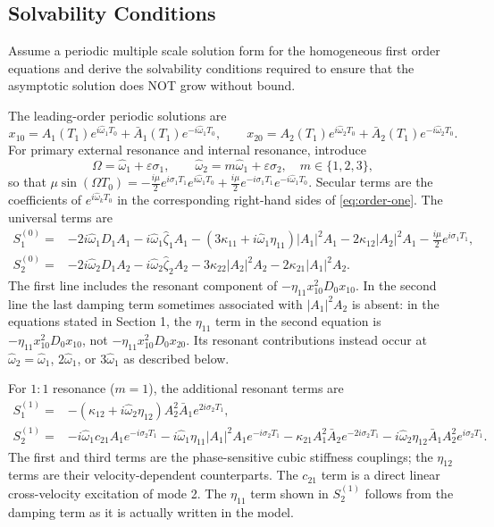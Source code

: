 \documentclass[11pt]{article}
\newenvironment{assignmentinstruction}{\par\begingroup\color{blue}}{\par\endgroup}
\begin{document}
\subsection{Solvability Conditions}
\begin{assignmentinstruction}
Assume a periodic multiple scale solution form for the homogeneous first order equations and derive the solvability conditions required to ensure that the asymptotic solution does NOT grow without bound.
\end{assignmentinstruction}
The leading-order periodic solutions are
\[
x_{10}=A_1(T_1)e^{i\hat{\omega}_1T_0}+\bar A_1(T_1)e^{-i\hat{\omega}_1T_0},\qquad
x_{20}=A_2(T_1)e^{i\hat{\omega}_2T_0}+\bar A_2(T_1)e^{-i\hat{\omega}_2T_0}.
\]
For primary external resonance and internal resonance, introduce
\[
\Omega=\hat{\omega}_1+\varepsilon\sigma_1,\qquad
\hat{\omega}_2=m\hat{\omega}_1+\varepsilon\sigma_2,\quad m\in\{1,2,3\},
\]
so that $\mu\sin(\Omega T_0)=-\frac{i\mu}{2}e^{i\sigma_1T_1}e^{i\hat{\omega}_1T_0}+\frac{i\mu}{2}e^{-i\sigma_1T_1}e^{-i\hat{\omega}_1T_0}$. Secular terms are the coefficients of $e^{i\hat{\omega}_kT_0}$ in the corresponding right-hand sides of \eqref{eq:order-one}. The universal terms are
\begin{align*}
S_1^{(0)}={}&-2i\hat{\omega}_1D_1A_1-i\hat{\omega}_1\hat{\zeta}_1A_1
-(3\kappa_{11}+i\hat{\omega}_1\eta_{11})|A_1|^2A_1-2\kappa_{12}|A_2|^2A_1
-\frac{i\mu}{2}e^{i\sigma_1T_1},\\
S_2^{(0)}={}&-2i\hat{\omega}_2D_1A_2-i\hat{\omega}_2\hat{\zeta}_2A_2
-3\kappa_{22}|A_2|^2A_2-2\kappa_{21}|A_1|^2A_2.
\end{align*}
The first line includes the resonant component of $-\eta_{11}x_{10}^2D_0x_{10}$. In the second line the last damping term sometimes associated with $|A_1|^2A_2$ is absent: in the equations stated in Section 1, the $\eta_{11}$ term in the second equation is $-\eta_{11}x_{10}^2D_0x_{10}$, not $-\eta_{11}x_{10}^2D_0x_{20}$. Its resonant contributions instead occur at $\hat{\omega}_2=\hat{\omega}_1$, $2\hat{\omega}_1$, or $3\hat{\omega}_1$ as described below.

For $1{:}1$ resonance ($m=1$), the additional resonant terms are
\begin{align*}
S_1^{(1)}={}&-(\kappa_{12}+i\hat{\omega}_2\eta_{12})A_2^2\bar A_1e^{2i\sigma_2T_1},\\
S_2^{(1)}={}&-i\hat{\omega}_1c_{21}A_1e^{-i\sigma_2T_1}
-i\hat{\omega}_1\eta_{11}|A_1|^2A_1e^{-i\sigma_2T_1}
-\kappa_{21}A_1^2\bar A_2e^{-2i\sigma_2T_1}
-i\hat{\omega}_2\eta_{12}\bar A_1A_2^2e^{i\sigma_2T_1}.
\end{align*}
The first and third terms are the phase-sensitive cubic stiffness couplings; the $\eta_{12}$ terms are their velocity-dependent counterparts. The $c_{21}$ term is a direct linear cross-velocity excitation of mode 2. The $\eta_{11}$ term shown in $S_2^{(1)}$ follows from the damping term as it is actually written in the model.
\end{document}
